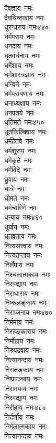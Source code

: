 \begin{multicols}{\maxColumns}
\begin{flushleft}
दैवज्ञाय~नमः\\
दैवचिन्तकाय~नमः\\
धुरन्धराय~नमः\hfill ४४०\\
धर्मपराय~नमः\\
धनदाय~नमः\\
धृतवर्धनाय~नमः\\
धर्मेशाय~नमः\\
धर्मशास्त्रज्ञाय~नमः\\
धन्विने~नमः\\
धर्मपरायणाय~नमः\\
धनाध्यक्षाय~नमः\\
धनपतये~नमः\\
धृतिमते~नमः\hfill ४५०\\
धूतकिल्बिषाय~नमः\\
धर्महेतवे~नमः\\
धर्मशूराय~नमः\\
धर्मकृते~नमः\\
धर्मविदे~नमः\\
ध्रुवाय~नमः\\
धात्रे~नमः\\
धीमते~नमः\\
धर्मचारिणे~नमः\\
धन्याय~नमः\hfill ४६०\\
धुर्याय~नमः\\
धृतव्रताय~नमः\\
नित्यसत्त्वाय~नमः\\
नित्यतृप्ताय~नमः\\
निर्लेपाय~नमः\\
निश्चलात्मकाय~नमः\\
निरवद्याय~नमः\\
निराधाराय~नमः\\
निष्कलङ्काय~नमः\\
निरञ्जनाय~नमः\hfill ४७०\\
निर्ममाय~नमः\\
निरहङ्काराय~नमः\\
निर्मोहाय~नमः\\
निरुपद्रवाय~नमः\\
नित्यानन्दाय~नमः\\
निरातङ्काय~नमः\\
निष्प्रपञ्चाय~नमः\\
निरामयाय~नमः\\
निरवद्याय~नमः\\
निरीहाय~नमः\hfill ४८०\\
निर्दर्शाय~नमः\\
निर्मलात्मकाय~नमः\\
नित्यानन्दाय~नमः\\

\end{flushleft}
\end{multicols}
